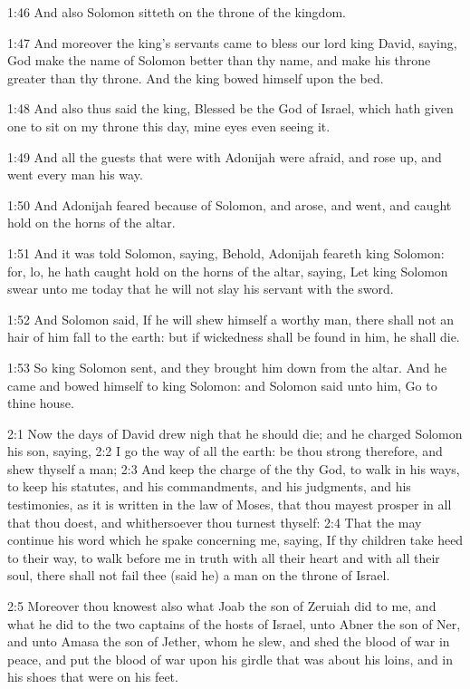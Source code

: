 1:46 And also Solomon sitteth on the throne of the kingdom.

1:47 And moreover the king's servants came to bless our lord king
David, saying, God make the name of Solomon better than thy name, and
make his throne greater than thy throne. And the king bowed himself
upon the bed.

1:48 And also thus said the king, Blessed be the \LORD God of Israel,
which hath given one to sit on my throne this day, mine eyes even
seeing it.

1:49 And all the guests that were with Adonijah were afraid, and rose
up, and went every man his way.

1:50 And Adonijah feared because of Solomon, and arose, and went, and
caught hold on the horns of the altar.

1:51 And it was told Solomon, saying, Behold, Adonijah feareth king
Solomon: for, lo, he hath caught hold on the horns of the altar,
saying, Let king Solomon swear unto me today that he will not slay his
servant with the sword.

1:52 And Solomon said, If he will shew himself a worthy man, there
shall not an hair of him fall to the earth: but if wickedness shall be
found in him, he shall die.

1:53 So king Solomon sent, and they brought him down from the altar.
And he came and bowed himself to king Solomon: and Solomon said unto
him, Go to thine house.

2:1 Now the days of David drew nigh that he should die; and he charged
Solomon his son, saying, 2:2 I go the way of all the earth: be thou
strong therefore, and shew thyself a man; 2:3 And keep the charge of
the \LORD thy God, to walk in his ways, to keep his statutes, and his
commandments, and his judgments, and his testimonies, as it is written
in the law of Moses, that thou mayest prosper in all that thou doest,
and whithersoever thou turnest thyself: 2:4 That the \LORD may continue
his word which he spake concerning me, saying, If thy children take
heed to their way, to walk before me in truth with all their heart and
with all their soul, there shall not fail thee (said he) a man on the
throne of Israel.

2:5 Moreover thou knowest also what Joab the son of Zeruiah did to me,
and what he did to the two captains of the hosts of Israel, unto Abner
the son of Ner, and unto Amasa the son of Jether, whom he slew, and
shed the blood of war in peace, and put the blood of war upon his
girdle that was about his loins, and in his shoes that were on his
feet.

